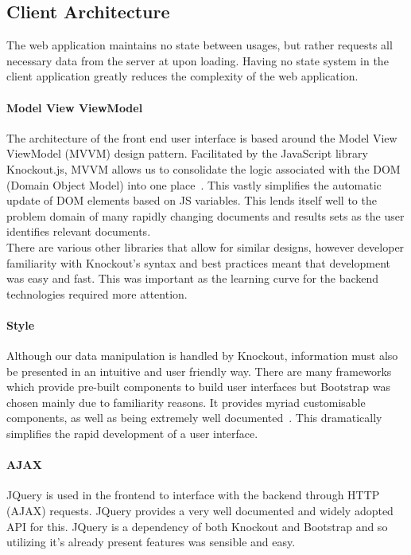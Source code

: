 \documentclass{l4proj}
\begin{document}
\subsection{Client Architecture}
The web application maintains no state between usages, but rather requests all necessary data from the server at upon loading. Having no state system in the client application greatly reduces the complexity of the web application.
\paragraph{Model View ViewModel}
The architecture of the front end user interface is based around the Model View ViewModel (MVVM) design pattern. Facilitated by the JavaScript library Knockout.js, MVVM allows us to consolidate the logic associated with the DOM (Domain Object Model) into one place~\cite{knockout}.
This vastly simplifies the automatic update of DOM elements based on JS variables.
This lends itself well to the problem domain of many rapidly changing documents and results sets as the user identifies relevant documents. \\
There are various other libraries that allow for similar designs, however developer familiarity with Knockout's syntax and best practices meant that development was easy and fast.
This was important as the learning curve for the backend technologies required more attention.

\paragraph{Style}
Although our data manipulation is handled by Knockout, information must also be presented in an intuitive and user friendly way. There are many frameworks which provide pre-built components to build user interfaces but Bootstrap was chosen mainly due to familiarity reasons. It provides myriad customisable components, as well as being extremely well documented~\cite{bootstrap}. This dramatically simplifies the rapid development of a user interface.

\paragraph{AJAX}
JQuery is used in the frontend to interface with the backend through HTTP (AJAX) requests. JQuery provides a very well documented and widely adopted API for this. JQuery is a dependency of both Knockout and Bootstrap and so utilizing it's already present features was sensible and easy.
\end{document}
